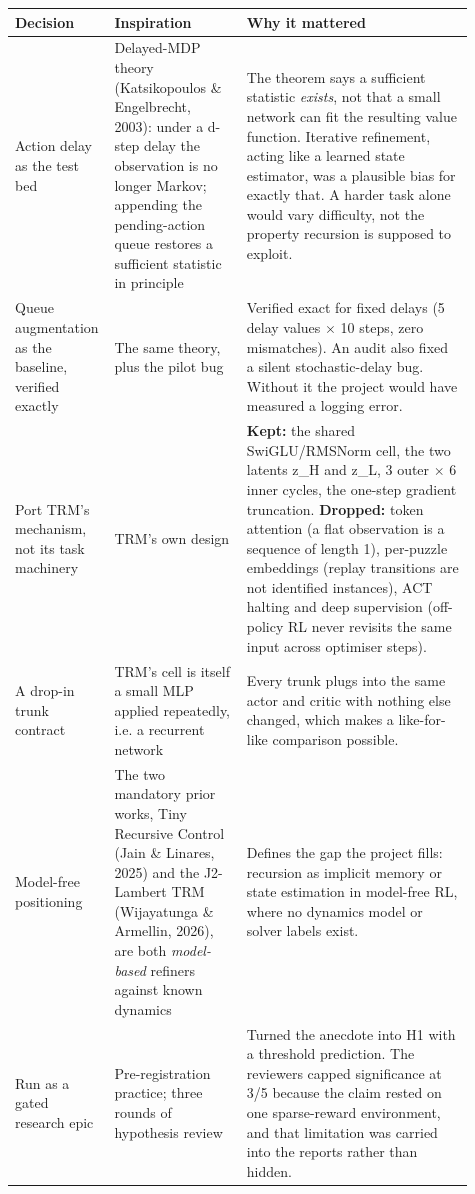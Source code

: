 \documentclass[11pt]{article}
\begin{document}
\begin{center}\small\begin{tabular}{>{\raggedright\arraybackslash}p{0.138\linewidth}>{\raggedright\arraybackslash}p{0.282\linewidth}>{\raggedright\arraybackslash}p{0.486\linewidth}}
\toprule
Decision & Inspiration & Why it mattered \\
\midrule
Action delay as the test bed & Delayed-MDP theory (Katsikopoulos \& Engelbrecht, 2003): under a d-step delay the observation is no longer Markov; appending the pending-action queue restores a sufficient statistic in principle & The theorem says a sufficient statistic \emph{exists}, not that a small network can fit the resulting value function. Iterative refinement, acting like a learned state estimator, was a plausible bias for exactly that. A harder task alone would vary difficulty, not the property recursion is supposed to exploit. \\
Queue augmentation as the baseline, verified exactly & The same theory, plus the pilot bug & Verified exact for fixed delays (5 delay values $\times$ 10 steps, zero mismatches). An audit also fixed a silent stochastic-delay bug. Without it the project would have measured a logging error. \\
Port TRM's mechanism, not its task machinery & TRM's own design & \textbf{Kept:} the shared SwiGLU/RMSNorm cell, the two latents z\_H and z\_L, 3 outer $\times$ 6 inner cycles, the one-step gradient truncation. \textbf{Dropped:} token attention (a flat observation is a sequence of length 1), per-puzzle embeddings (replay transitions are not identified instances), ACT halting and deep supervision (off-policy RL never revisits the same input across optimiser steps). \\
A drop-in trunk contract & TRM's cell is itself a small MLP applied repeatedly, i.e. a recurrent network & Every trunk plugs into the same actor and critic with nothing else changed, which makes a like-for-like comparison possible. \\
Model-free positioning & The two mandatory prior works, Tiny Recursive Control (Jain \& Linares, 2025) and the J2-Lambert TRM (Wijayatunga \& Armellin, 2026), are both \emph{model-based} refiners against known dynamics & Defines the gap the project fills: recursion as implicit memory or state estimation in model-free RL, where no dynamics model or solver labels exist. \\
Run as a gated research epic & Pre-registration practice; three rounds of hypothesis review & Turned the anecdote into H1 with a threshold prediction. The reviewers capped significance at 3/5 because the claim rested on one sparse-reward environment, and that limitation was carried into the reports rather than hidden. \\

\end{tabular}
\end{center}
\end{document}

